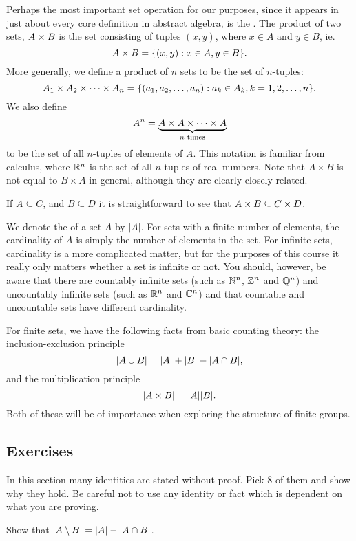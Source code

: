 Perhaps the most important set operation for our purposes, since it appears
in just about every core definition in abstract algebra, is the .  The product of two sets, $A \times B$ is the set
consisting of tuples $(x,y)$, where $x \in A$ and $y \in B$, ie.
\[
  A \times B = \{(x,y) : x \in A, y \in B\}.
\]
More generally, we define a product of $n$ sets to be the set of $n$-tuples:
\[
  A_{1} \times A_{2} \times \cdots \times A_{n} = \{ (a_{1}, a_{2}, \ldots,
a_{n}) : a_{k} \in A_{k}, k = 1, 2, \ldots, n\}.
\]
We also define
\[
  A^{n} = \underbrace{A \times A \times \cdots \times A}_{n\text{ times}}
\]
to be the set of all $n$-tuples of elements of $A$. This notation is familiar
from calculus, where $\mathbb{R}^{n}$ is the set of all $n$-tuples of real numbers.
Note that $A \times B$ is not equal to $B \times A$ in general, although they
are clearly closely related.

If $A \subseteq C$, and $B \subseteq D$ it is straightforward to see that
$A \times B \subseteq C \times D$.

We denote the  of a set $A$ by $|A|$.  For sets
with a finite number of elements, the cardinality of $A$ is simply the number
of elements in the set.  For infinite sets, cardinality is a more complicated
matter, but for the purposes of this course it really only matters whether a
set is infinite or not.  You should, however, be aware that there are
countably infinite sets (such as $\mathbb{N}^{n}$, $\mathbb{Z}^{n}$ and
$\mathbb{Q}^{n}$) and uncountably infinite sets (such as $\mathbb{R}^{n}$ and
$\mathbb{C}^{n}$) and that countable and uncountable sets have different
cardinality.

For finite sets, we have the following facts from basic counting theory:
the inclusion-exclusion principle
\[
  |A \cup B| = |A| + |B| - |A \cap B|,
\]
and the multiplication principle
\[
  |A \times B| = |A||B|.
\]
Both of these will be of importance when exploring the structure of finite
groups.

\subsection*{Exercises}

\begin{exercises}
  \item In this section many identities are stated without proof.  Pick
    8 of them and show why they hold.  Be careful not to use any identity
    or fact which is dependent on what you are proving.
  
  \item Show that $|A \setminus B| = |A| - |A \cap B|$.
\end{exercises}

